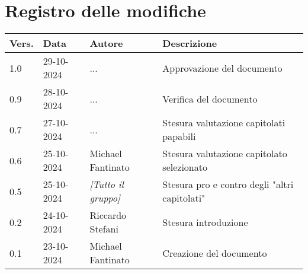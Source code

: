 \section*{Registro delle modifiche}

\begin{table}[h]
    \centering
    \begin{tabular}{|l|l|l|p{5cm}|}
        \hline
        \rowcolor[gray]{0.9}
        \textbf{Vers.} & \textbf{Data} & \textbf{Autore} & \textbf{Descrizione}\\
        \hline
        1.0 & 29-10-2024 & ... & Approvazione del documento\\
        \hline
        0.9 & 28-10-2024 & ... & Verifica del documento\\
        \hline
        0.7 & 27-10-2024 & ... & Stesura valutazione capitolati papabili\\
        \hline
        0.6 & 25-10-2024 & Michael Fantinato & Stesura valutazione capitolato selezionato\\
        \hline
        0.5 & 25-10-2024 & \emph{[Tutto il gruppo]} & Stesura pro e contro degli "altri capitolati"\\
        \hline
        0.2 & 24-10-2024 & Riccardo Stefani & Stesura introduzione\\
        \hline
        0.1 & 23-10-2024 & Michael Fantinato & Creazione del documento\\
        \hline
    \end{tabular}
\end{table}
